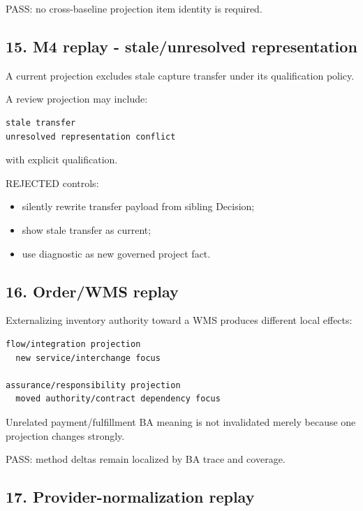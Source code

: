 \documentclass[11pt,a4paper]{article}
\providecommand{\tightlist}{\setlength{\itemsep}{0pt}\setlength{\parskip}{0pt}}
\begin{document}
PASS: no cross-baseline projection item identity is required.

\subsection{15. M4 replay - stale/unresolved
representation}\label{15-m4-replay---staleunresolved-representation}

A current projection excludes stale capture transfer under its
qualification policy.

A review projection may include:

\begin{verbatim}
stale transfer
unresolved representation conflict
\end{verbatim}

with explicit qualification.

REJECTED controls:

\begin{itemize}
\tightlist
\item
  silently rewrite transfer payload from sibling Decision;
\item
  show stale transfer as current;
\item
  use diagnostic as new governed project fact.
\end{itemize}

\subsection{16. Order/WMS replay}\label{16-orderwms-replay}

Externalizing inventory authority toward a WMS produces different local
effects:

\begin{verbatim}
flow/integration projection
  new service/interchange focus

assurance/responsibility projection
  moved authority/contract dependency focus
\end{verbatim}

Unrelated payment/fulfillment BA meaning is not invalidated merely
because one projection changes strongly.

PASS: method deltas remain localized by BA trace and coverage.

\subsection{17. Provider-normalization
replay}\label{17-provider-normalization-replay}
\end{document}
